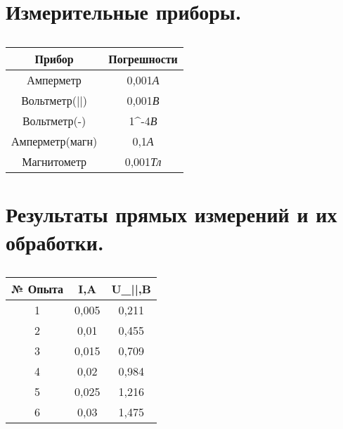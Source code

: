 \documentclass[12pt,letterpaper]{article}
\begin{document}
      \section{Измерительные приборы.}\par
      \begin{table}[h!]
          \centering
          \caption{}
          \begin{tabular}{|c|c|}
                \hline
               Прибор&Погрешности\\
               \hline
               Амперметр&0,001\textit{А}\\
               \hline
               Вольтметр(||)&0,001\textit{В}\\
               \hline
               Вольтметр(-)&1\cdot10^{-4}\textit{В}\\
               \hline
               Амперметр(магн)&0,1\textit{А}\\
               \hline
               Магнитометр&0,001\textit{Тл}\\
               \hline
          \end{tabular}
          \end{table}


      \section{Результаты прямых измерений и их обработки.}\par

      \begin{table}[h!]
          \centering
          \caption{}
          \begin{tabular}{|c|c|c|}
                \hline
               № Опыта&I,A&U_{||},B \\
               \hline
               1&0,005&0,211\\
               \hline
               2&0,01&0,455\\
               \hline
               3&0,015&0,709\\
               \hline
               4&0,02&0,984\\
               \hline
               5&0,025&1,216\\
               \hline
               6&0,03&1,475\\
               \hline
          \end{tabular}
          \label{tab:my_label}
      \end{table}
\end{document}
